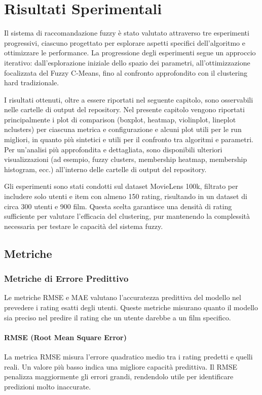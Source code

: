 \chapter{Risultati Sperimentali}
\label{chap:chap5}

Il sistema di raccomandazione fuzzy è stato valutato attraverso tre esperimenti progressivi, ciascuno progettato per esplorare aspetti specifici dell'algoritmo e ottimizzare le performance. La progressione degli esperimenti segue un approccio iterativo: dall'esplorazione iniziale dello spazio dei parametri, all'ottimizzazione focalizzata del Fuzzy C-Means, fino al confronto approfondito con il clustering hard tradizionale.

I risultati ottenuti, oltre a essere riportati nel seguente capitolo, sono osservabili nelle cartelle di output del repository. Nel presente capitolo vengono riportati principalmente i plot di comparison (boxplot, heatmap, violinplot, lineplot nclusters) per ciascuna metrica e configurazione e alcuni plot utili per le run migliori, in quanto più sintetici e utili per il confronto tra algoritmi e parametri. Per un'analisi più approfondita e dettagliata, sono disponibili ulteriori visualizzazioni (ad esempio, fuzzy clusters, membership heatmap, membership histogram, ecc.) all'interno delle cartelle di output del repository.

Gli esperimenti sono stati condotti sul dataset MovieLens 100k, filtrato per includere solo utenti e item con almeno 150 rating, risultando in un dataset di circa 300 utenti e 900 film. Questa scelta garantisce una densità di rating sufficiente per valutare l'efficacia del clustering, pur mantenendo la complessità necessaria per testare le capacità del sistema fuzzy.

\section{Metriche}

\subsection{Metriche di Errore Predittivo}

Le metriche RMSE e MAE valutano l'accuratezza predittiva del modello nel prevedere i rating esatti degli utenti. Queste metriche misurano quanto il modello sia preciso nel predire il rating che un utente darebbe a un film specifico.

\subsubsection{RMSE (Root Mean Square Error)}
La metrica RMSE misura l'errore quadratico medio tra i rating predetti e quelli reali. Un valore più basso indica una migliore capacità predittiva. Il RMSE penalizza maggiormente gli errori grandi, rendendolo utile per identificare predizioni molto inaccurate.

